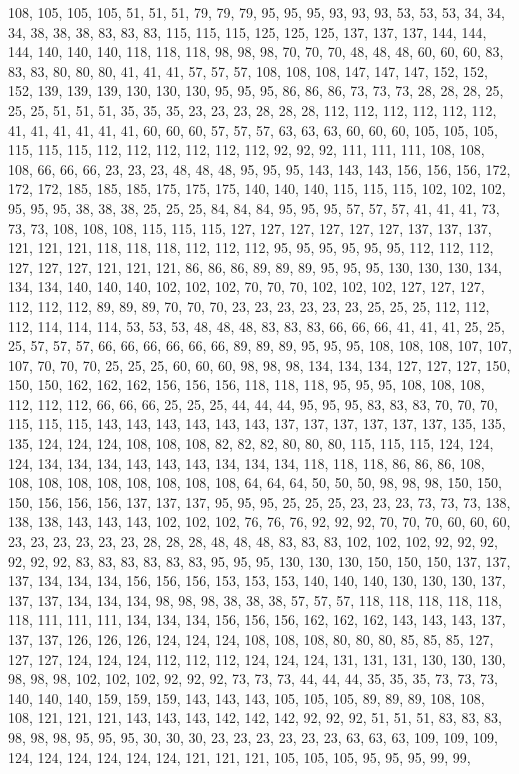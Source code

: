 108, 105, 105, 105, 51, 51, 51, 79, 79, 79, 95, 95, 95, 93, 93, 93, 53, 53, 53, 34, 34, 34, 38, 38, 38, 83, 83, 83, 115, 115, 115, 125, 125, 125, 137, 137, 137, 144, 144, 144, 140, 140, 140, 118, 118, 118, 98, 98, 98, 70, 70, 70, 48, 48, 48, 60, 60, 60, 83, 83, 83, 80, 80, 80, 41, 41, 41, 57, 57, 57, 108, 108, 108, 147, 147, 147, 152, 152, 152, 139, 139, 139, 130, 130, 130, 95, 95, 95, 86, 86, 86, 73, 73, 73, 28, 28, 28, 25, 25, 25, 51, 51, 51, 35, 35, 35, 23, 23, 23, 28, 28, 28, 112, 112, 112, 112, 112, 112, 41, 41, 41, 41, 41, 41, 60, 60, 60, 57, 57, 57, 63, 63, 63, 60, 60, 60, 105, 105, 105, 115, 115, 115, 112, 112, 112, 112, 112, 112, 92, 92, 92, 111, 111, 111, 108, 108, 108, 66, 66, 66, 23, 23, 23, 48, 48, 48, 95, 95, 95, 143, 143, 143, 156, 156, 156, 172, 172, 172, 185, 185, 185, 175, 175, 175, 140, 140, 140, 115, 115, 115, 102, 102, 102, 95, 95, 95, 38, 38, 38, 25, 25, 25, 84, 84, 84, 95, 95, 95, 57, 57, 57, 41, 41, 41, 73, 73, 73, 108, 108, 108, 115, 115, 115, 127, 127, 127, 127, 127, 127, 137, 137, 137, 121, 121, 121, 118, 118, 118, 112, 112, 112, 95, 95, 95, 95, 95, 95, 112, 112, 112, 127, 127, 127, 121, 121, 121, 86, 86, 86, 89, 89, 89, 95, 95, 95, 130, 130, 130, 134, 134, 134, 140, 140, 140, 102, 102, 102, 70, 70, 70, 102, 102, 102, 127, 127, 127, 112, 112, 112, 89, 89, 89, 70, 70, 70, 23, 23, 23, 23, 23, 23, 25, 25, 25, 112, 112, 112, 114, 114, 114, 53, 53, 53, 48, 48, 48, 83, 83, 83, 66, 66, 66, 41, 41, 41, 25, 25, 25, 57, 57, 57, 66, 66, 66, 66, 66, 66, 89, 89, 89, 95, 95, 95, 108, 108, 108, 107, 107, 107, 70, 70, 70, 25, 25, 25, 60, 60, 60, 98, 98, 98, 134, 134, 134, 127, 127, 127, 150, 150, 150, 162, 162, 162, 156, 156, 156, 118, 118, 118, 95, 95, 95, 108, 108, 108, 112, 112, 112, 66, 66, 66, 25, 25, 25, 44, 44, 44, 95, 95, 95, 83, 83, 83, 70, 70, 70, 115, 115, 115, 143, 143, 143, 143, 143, 143, 137, 137, 137, 137, 137, 137, 135, 135, 135, 124, 124, 124, 108, 108, 108, 82, 82, 82, 80, 80, 80, 115, 115, 115, 124, 124, 124, 134, 134, 134, 143, 143, 143, 134, 134, 134, 118, 118, 118, 86, 86, 86, 108, 108, 108, 108, 108, 108, 108, 108, 108, 64, 64, 64, 50, 50, 50, 98, 98, 98, 150, 150, 150, 156, 156, 156, 137, 137, 137, 95, 95, 95, 25, 25, 25, 23, 23, 23, 73, 73, 73, 138, 138, 138, 143, 143, 143, 102, 102, 102, 76, 76, 76, 92, 92, 92, 70, 70, 70, 60, 60, 60, 23, 23, 23, 23, 23, 23, 28, 28, 28, 48, 48, 48, 83, 83, 83, 102, 102, 102, 92, 92, 92, 92, 92, 92, 83, 83, 83, 83, 83, 83, 95, 95, 95, 130, 130, 130, 150, 150, 150, 137, 137, 137, 134, 134, 134, 156, 156, 156, 153, 153, 153, 140, 140, 140, 130, 130, 130, 137, 137, 137, 134, 134, 134, 98, 98, 98, 38, 38, 38, 57, 57, 57, 118, 118, 118, 118, 118, 118, 111, 111, 111, 134, 134, 134, 156, 156, 156, 162, 162, 162, 143, 143, 143, 137, 137, 137, 126, 126, 126, 124, 124, 124, 108, 108, 108, 80, 80, 80, 85, 85, 85, 127, 127, 127, 124, 124, 124, 112, 112, 112, 124, 124, 124, 131, 131, 131, 130, 130, 130, 98, 98, 98, 102, 102, 102, 92, 92, 92, 73, 73, 73, 44, 44, 44, 35, 35, 35, 73, 73, 73, 140, 140, 140, 159, 159, 159, 143, 143, 143, 105, 105, 105, 89, 89, 89, 108, 108, 108, 121, 121, 121, 143, 143, 143, 142, 142, 142, 92, 92, 92, 51, 51, 51, 83, 83, 83, 98, 98, 98, 95, 95, 95, 30, 30, 30, 23, 23, 23, 23, 23, 23, 63, 63, 63, 109, 109, 109, 124, 124, 124, 124, 124, 124, 121, 121, 121, 105, 105, 105, 95, 95, 95, 99, 99, 